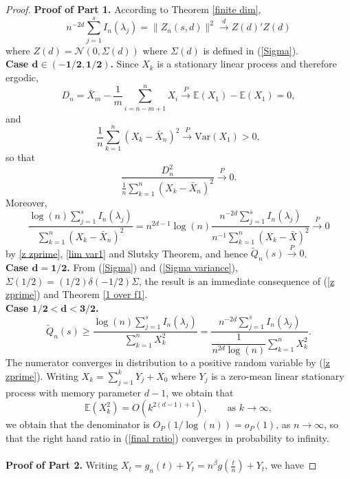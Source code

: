 \documentclass[10pt,a4paper]{amsart}
\numberwithin{equation}{section}
\begin{document}
\begin{proof}
{\bf Proof of Part 1.}
According to Theorem \ref{finite dim},
\begin{equation}\label{z zprime}
n^{-2d}\sum_{j=1}^sI_n(\lambda_j)=\|Z_n(s,d)\|^2\overset{d}{\longrightarrow}Z(d)'Z(d)
\end{equation}
where $Z(d)=\mathcal{N}\left(0,\Sigma(d)\right)$ where $\Sigma(d)$ is defined in (\ref{Sigma}). \\
{\bf Case  $\mathbf{d\in(-1/2,1/2)}$.}  Since $X_k$ is a stationary linear process and therefore ergodic, 
$$
D_n=\bar X_m-\frac{1}{m}\sum_{i=n-m+1}^nX_i\overset{P}{\to}\mathbb{E}(X_1)-\mathbb{E}(X_1)=0,
$$
and
$$\frac{1}{n}\sum_{k=1}^n(X_k-\bar X_n)^2\overset{P}{\to}\textrm{Var}(X_1)>0,
$$
so that
\begin{equation}\label{lim var1}
\frac{D_n^2}{\frac{1}{n}\displaystyle\sum_{k=1}^n(X_k-\bar X_n)^2}\overset{P}{\to}0.
\end{equation}
Moreover,
$$
\frac{\log (n)\displaystyle\sum_{j=1}^sI_n(\lambda_j)}{\displaystyle\sum_{k=1}^n(X_k-\bar X_n)^2}=n^{2d-1}\log(n)\frac{n^{-2d}\displaystyle\sum_{j=1}^sI_n(\lambda_j)}{n^{-1}\displaystyle\sum_{k=1}^n(X_k-\bar X)^2}\overset{P}{\to}0
$$
by \eqref{z zprime}, \eqref{lim var1} and Slutsky Theorem, and hence $\tilde Q_n(s)\overset{P}{\to}0$.\\
{\bf Case  $\mathbf{d=1/2}$.} From (\ref{Sigma}) and  (\ref{Sigma variance}), $\Sigma(1/2)=(1/2)\delta(-1/2)\Sigma$, the result is an immediate consequence of (\ref{z zprime}) and Theorem  \ref{1 over f1}.\\
{\bf Case $\mathbf{1/2<d<3/2}$.} 
\begin{equation}\label{final ratio}
\tilde Q_n(s)\ge\frac{\log (n)\displaystyle\sum_{j=1}^sI_n(\lambda_j)}{\displaystyle\sum_{k=1}^nX_k^2}=\frac{n^{-2d}\displaystyle\sum_{j=1}^sI_n(\lambda_j)}{\dfrac{1}{n^{2d}\log (n)}\displaystyle\sum_{k=1}^nX_k^2}.
\end{equation}
The numerator converges in distribution to a positive random variable by (\ref{z zprime}). Writing $X_k=\sum_{j=1}^kY_j+X_0$ where $Y_j$ is a zero-mean linear stationary process with memory parameter $d-1$, we obtain that
$$
\mathbb{E}(X_k^2)=O\left(k^{2(d-1)+1}\right),\qquad\textrm{as }k\to\infty,
$$
we obtain that the denominator is $O_P(1/\log(n))=o_P(1)$, as $n\to\infty$, so that the right hand ratio in (\ref{final ratio}) converges  in probability to infinity.\\\\
{\bf Proof of Part 2.}
Writing $X_t=g_n(t)+Y_t=n^\beta g\left(\frac{t}{n}\right)+Y_t$, we have

\end{proof}
\end{document}
